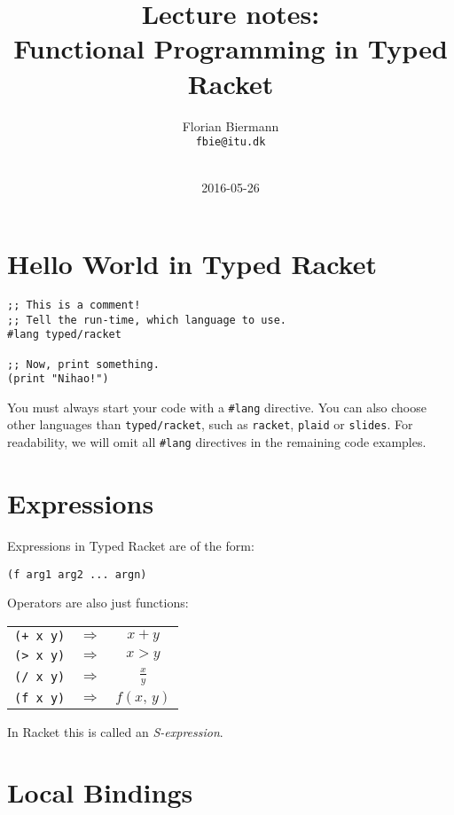 \documentclass{article}
\title{Lecture notes:\\Functional Programming in Typed Racket}
\author{Florian Biermann \\\small{\texttt{fbie@itu.dk}} \\~}
\date{2016-05-26}
\begin{document}
\maketitle

\section{Hello World in Typed Racket}

\begin{lstlisting}
;; This is a comment!
;; Tell the run-time, which language to use.
#lang typed/racket

;; Now, print something.
(print "Nihao!")
\end{lstlisting}

You must always start your code with a \lstinline{#lang} directive. You can also choose other languages than \lstinline{typed/racket}, such as \lstinline{racket}, \lstinline{plaid} or \lstinline{slides}. For readability, we will omit all \lstinline{#lang} directives in the remaining code examples.

\section{Expressions}

Expressions in Typed Racket are of the form:

\begin{center}
  \lstinline{(f arg1 arg2 ... argn)}
\end{center}

Operators are also just functions:

\begin{center}
  \begin{tabular}{ccc}
    \lstinline{(+ x y)} & $\Rightarrow$ & $x + y$ \\
    \lstinline{(> x y)} & $\Rightarrow$ & $x > y$ \\
    \lstinline{(/ x y)} & $\Rightarrow$ & $\frac{x}{y}$ \\
    \lstinline{(f x y)} & $\Rightarrow$ & $f(x, \, y)$
  \end{tabular}
\end{center}

In Racket this is called an \emph{S-expression}.

\section{Local Bindings}
\end{document}
